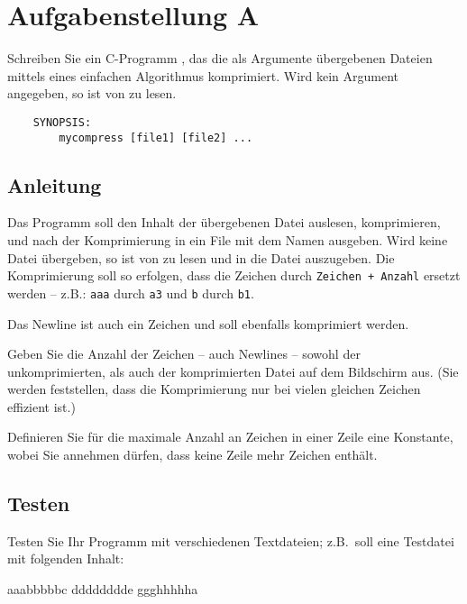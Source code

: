




\section*{Aufgabenstellung A}
      Schreiben Sie ein C-Programm ,
      das die als Argumente übergebenen Dateien mittels
      eines einfachen Algorithmus komprimiert.
      Wird kein Argument angegeben, so ist von
       zu lesen.
\begin{verbatim}
    SYNOPSIS:
        mycompress [file1] [file2] ...
\end{verbatim}

\subsection*{Anleitung}
      Das Programm soll den Inhalt der übergebenen Datei
      auslesen, komprimieren, und nach der Komprimierung in ein
      File mit dem Namen 
      ausgeben. Wird keine Datei übergeben, so ist von  zu
      lesen und in die Datei  auszugeben. Die
      Komprimierung soll so erfolgen, dass die Zeichen durch
      \verb|Zeichen + Anzahl| ersetzt werden -- z.B.: \verb|aaa| durch \verb|a3|
      und \verb|b| durch \verb|b1|.

      Das Newline ist auch ein Zeichen und soll ebenfalls komprimiert werden.

      Geben Sie die Anzahl der Zeichen -- auch Newlines --
      sowohl der unkomprimierten, als auch der komprimierten Datei
      auf dem Bildschirm aus. (Sie werden feststellen, dass die
      Komprimierung nur bei vielen gleichen Zeichen effizient ist.)

      Definieren Sie für die maximale Anzahl an Zeichen in einer
      Zeile eine Konstante, wobei Sie annehmen dürfen, dass keine
      Zeile mehr Zeichen enthält.

\subsection*{Testen}
      Testen Sie Ihr Programm mit verschiedenen Textdateien; z.B.\ soll
      eine Testdatei  mit folgenden Inhalt:

\begin{osuefmtcode}
      aaabbbbbc
      dddddddde
      ggghhhhha
\end{osuefmtcode}


